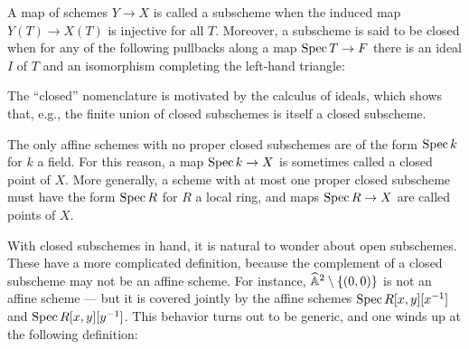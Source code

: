 \begin{definition}\label{ClosedSubschemes}
A map of schemes $Y \to X$ is called a subscheme when the induced map $Y(T) \to X(T)$ is injective for all $T$.  Moreover, a subscheme is said to be closed when for any of the following pullbacks along a map $\operatorname{Spec} T \to F$ there is an ideal $I$ of $T$ and an isomorphism completing the left-hand triangle:
\begin{center}
\end{center}
\end{definition}

\begin{remark}
The ``closed'' nomenclature is motivated by the calculus of ideals, which shows that, e.g., the finite union of closed subschemes is itself a closed subscheme.
\end{remark}

\begin{example}
The only affine schemes with no proper closed subschemes are of the form $\operatorname{Spec} k$ for $k$ a field.  For this reason, a map $\operatorname{Spec} k \to X$ is sometimes called a closed point of $X$.  More generally, a scheme with at most one proper closed subscheme must have the form $\operatorname{Spec} R$ for $R$ a local ring, and maps $\operatorname{Spec} R \to X$ are called points of $X$.
\end{example}

With closed subschemes in hand, it is natural to wonder about open subschemes.  These have a more complicated definition, because the complement of a closed subscheme may not be an affine scheme.  For instance, $\widehat{\mathbb{A}}^2 \setminus \{(0, 0)\}$ is not an affine scheme --- but it is covered jointly by the affine schemes $\operatorname{Spec} R[x, y][x^{-1}]$ and $\operatorname{Spec} R[x, y][y^{-1}]$.  This behavior turns out to be generic, and one winds up at the following definition:

